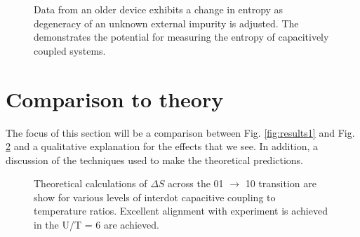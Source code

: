 \begin{figure}[h]
\centering
{}
\caption{ Data from an older device exhibits a change in entropy as degeneracy of an unknown external impurity is adjusted. The demonstrates the potential for measuring the entropy of capacitively coupled systems.}

\label{fig:sshape}       %
\end{figure}



\section{Comparison to theory}
\label{sec:discussion}

The focus of this section will be a comparison between Fig. \ref{fig:results1} and Fig. \ref{fig:yigal_theory} and a qualitative explanation for the effects that we see. In addition, a discussion of the techniques used to make the theoretical predictions.

\begin{figure}[h]
\centering
{}
\caption{Theoretical calculations of $\Delta S$ across the 01 $\to$ 10 transition are show for various levels of interdot capacitive coupling to temperature ratios. Excellent alignment with experiment is achieved in the U/T = 6 are achieved.}

\label{fig:yigal_theory}       %
\end{figure}

